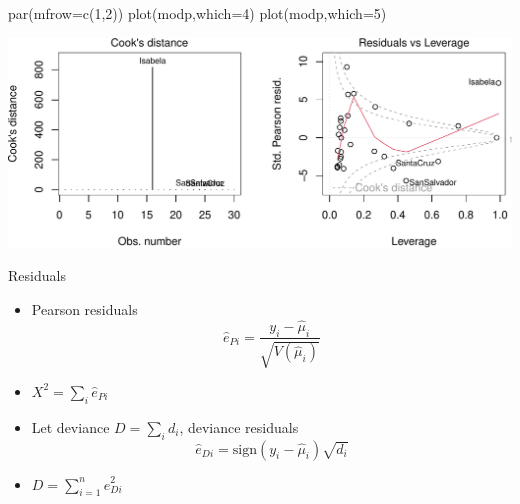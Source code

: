 \documentclass[
  ignorenonframetext,
]{beamer}
\newenvironment{Shaded}{\begin{snugshade}}{\end{snugshade}}
\newcommand{\AttributeTok}[1]{\textcolor[rgb]{0.77,0.63,0.00}{#1}}
\newcommand{\DecValTok}[1]{\textcolor[rgb]{0.00,0.00,0.81}{#1}}
\newcommand{\FunctionTok}[1]{\textcolor[rgb]{0.00,0.00,0.00}{#1}}
\newcommand{\NormalTok}[1]{#1}
\providecommand{\tightlist}{%
  \setlength{\itemsep}{0pt}\setlength{\parskip}{0pt}}
\begin{document}
\begin{frame}[fragile]{}
\protect\hypertarget{section-1}{}
\scriptsize

\begin{Shaded}
\begin{Highlighting}[]
\FunctionTok{par}\NormalTok{(}\AttributeTok{mfrow=}\FunctionTok{c}\NormalTok{(}\DecValTok{1}\NormalTok{,}\DecValTok{2}\NormalTok{))}
\FunctionTok{plot}\NormalTok{(modp,}\AttributeTok{which=}\DecValTok{4}\NormalTok{)}
\FunctionTok{plot}\NormalTok{(modp,}\AttributeTok{which=}\DecValTok{5}\NormalTok{)}
\end{Highlighting}
\end{Shaded}

\includegraphics{week8_p1_files/figure-beamer/unnamed-chunk-2-1.pdf}
\end{frame}

\begin{frame}{Residuals}
\protect\hypertarget{residuals}{}
\begin{itemize}
\tightlist
\item
  Pearson residuals
  \[\hat{e}_{Pi}=\frac{y_i-\hat{\mu}_i}{\sqrt{V(\hat{\mu}_i)}}\]
\item
  \(X^2=\sum_i\hat{e}_{Pi}\)
\item
  Let deviance \(D=\sum_id_i\), deviance
  residuals\[\hat{e}_{Di}=\mathrm{sign}\left(y_i-\hat{\mu}_i\right)\sqrt{d_i}\]
\item
  \(D=\sum_{i=1}^n\hat{e}_{Di}^2\)
\end{itemize}
\end{frame}
\end{document}

